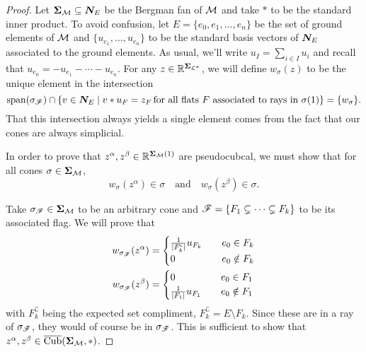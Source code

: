 \documentclass[12pt,oneside]{../../sfsuthesis}
\begin{document}
\begin{proof}
    Let \( \bm{\Sigma}_{\mathcal{M}} \subseteq \bm{N}_E \) be the Bergman fan of \( \mathcal{M} \) and take \( \ast \) to be the standard inner product.
    To avoid confusion, let \( E = \{ e_0, e_1, \dots, e_n \} \) be the set of ground elements of \( \mathcal{M} \) and \( \{ u_{e_1}, \dots, u_{e_n} \} \) to be the standard basis vectors of \( \bm{N}_E \) associated to the ground elements.
    As usual, we'll write \( u_I = \sum_{i \in I} u_i \) and recall that \( u_{e_0} = -u_{e_1} - \cdots - u_{e_n} \).
    For any \( z \in \mathbb{R}^{\bm{\Sigma}_{\mathcal{L}^\ast}} \), we will define \( w_{\sigma}(z) \) to be the unique element in the intersection
    \[
        \operatorname{span}(\sigma_{\mathscr{F}}) \cap \left\{ v \in \bm{N}_E \; \middle| \; v \ast u_F = z_F \, \text{for all flats \( F \) associated to rays in \( \sigma(1) \)} \right\} = \{ w_{\sigma} \}.
    \]
    That this intersection always yields a single element comes from the fact that our cones are always simplicial.

    In order to prove that \( z^\alpha, z^\beta \in \mathbb{R}^{\bm{\Sigma}_{\mathcal{M}}(1)} \) are pseudocubcal, we must show that for all cones \( \sigma \in \bm{\Sigma}_{\mathcal{M}} \),
    \[
        w_\sigma(z^\alpha) \in \sigma \quad \text{and} \quad w_\sigma(z^\beta) \in \sigma.
    \]

    Take \( \sigma_{\mathscr{F}} \in \bm{\Sigma}_{\mathcal{M}} \) to be an arbitrary cone and \( \mathscr{F} = \{ F_1 \subsetneq \cdots \subsetneq F_k \} \) to be its associated flag.
    We will prove that
    \begin{align*}
        w_{\sigma_{\mathscr{F}}}(z^\alpha) & = \begin{cases}
                                           \frac{1}{|F_k^{\mathsf{c}}|}u_{F_k} & \quad e_0 \in F_k    \\
                                           0                                  & \quad e_0 \notin F_k
                                       \end{cases}
        \\
        w_{\sigma_{\mathscr{F}}}(z^\beta)  & = \begin{cases}
                                           0                      & \quad e_0 \in F_1    \\
                                           \frac{1}{|F_1|}u_{F_1} & \quad e_0 \notin F_1
                                       \end{cases}
    \end{align*}
    with \( F_k^\complement \) being the expected set compliment, \( F_k^\complement = E \setminus F_k \).
    Since these are in a ray of \( \sigma_{\mathscr{F}} \), they would of course be in \( \sigma_{\mathscr{F}} \).
    This is sufficient to show that \(  z^\alpha, z^\beta \in \operatorname{\overline{Cub}}(\bm{\Sigma}_{\mathcal{M}}, \ast) \).


\end{proof}
\end{document}
